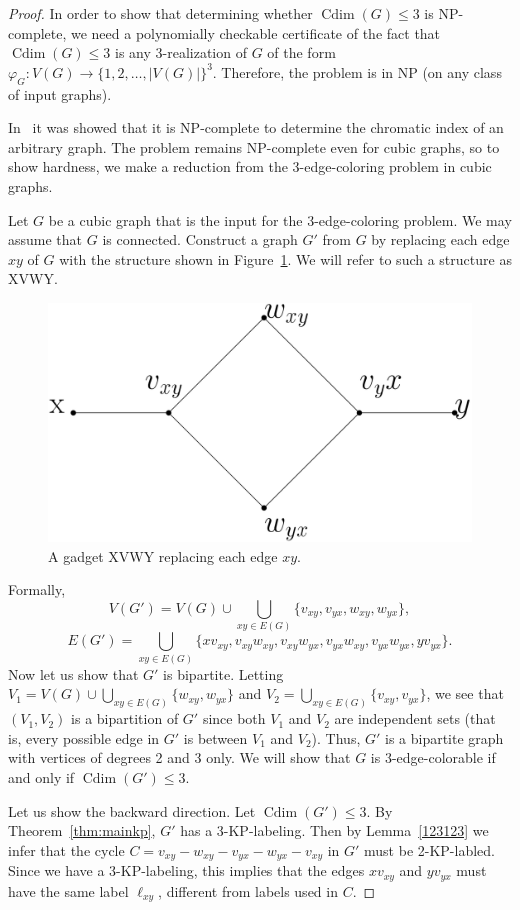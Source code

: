 \documentclass[12pt,a4paper,titlepage,openany]{report}
\DeclareMathOperator{\Cdim}{Cdim}
\begin{document}
\begin{proof}
In order to show that determining whether $\Cdim(G) \leq 3$ is NP-complete, we need a polynomially checkable certificate of the fact that $\Cdim(G) \leq 3$ is any 3-realization of $G$ of the form $\varphi_G : V(G) \to \{1,2,\ldots, |V(G)|\}^3$. 
Therefore, the problem is in NP (on any class of input graphs).

In~\cite{Ian} it was showed that it is NP-complete to determine the chromatic index of an arbitrary graph. The problem remains NP-complete even for cubic graphs, so to show hardness, we make a reduction from the 3-edge-coloring problem in cubic graphs.

Let $G$ be a cubic graph that is the input for the
3-edge-coloring problem. We may assume that $G$ is connected. Construct a graph $G'$ from $G$ by replacing each edge $xy$ of $G$ with the structure shown in Figure~\ref{gadget}. We will refer to such a structure as XVWY.

\begin{figure}[h]
\begin{center}
\includegraphics[width=0.6\linewidth]{figures/gadget.png}
\end{center}
\caption{A gadget XVWY replacing each edge $xy$.}\label{gadget}
\end{figure}
Formally,
$$V(G')= V(G)\cup
\bigcup_{xy\in E(G)} \{v_{xy}, v_{yx}, w_{xy}, w_{yx}\},$$
$$E(G')=\bigcup_{xy\in E(G)} \{xv_{xy}, v_{xy}w_{xy}, v_{xy}w_{yx}, v_{yx}w_{xy},v_{yx}w_{yx}, yv_{yx}\}.$$
Now let us show that $G'$ is bipartite. Letting $V_1=V(G)\cup
\bigcup_{xy\in E(G)} \{w_{xy},w_{yx}\}$ and $V_2=\bigcup_{xy\in E(G)} \{v_{xy},v_{yx}\}$, we see that $(V_1, V_2)$ is a bipartition of $G'$ since both $V_1$ and $V_2$ are independent sets (that is, every possible edge in $G'$ is between $V_1$ and $V_2$). Thus, $G'$ is a bipartite graph with vertices of degrees 2 and 3 only. We will show that $G$ is 3-edge-colorable if and only if $\Cdim(G')
\leq 3$.

Let us show the backward direction. Let $\Cdim(G')\leq 3$. By Theorem~\ref{thm:mainkp}, $G'$ has a 3-KP-labeling. Then by Lemma~\ref{123123} we infer that the cycle $C=v_{xy}-w_{xy}-v_{yx}-w_{yx}-v_{xy}$ in $G'$ must be 2-KP-labled. Since we have a 3-KP-labeling, this implies that the edges $xv_{xy}$ and $yv_{yx}$ must have the same label $\ell_{xy}$, different from labels used in $C$.


\end{proof}
\end{document}
